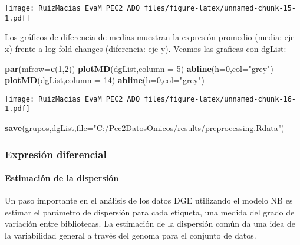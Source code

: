 \documentclass[
]{article}
\newenvironment{Shaded}{\begin{snugshade}}{\end{snugshade}}
\newcommand{\DataTypeTok}[1]{\textcolor[rgb]{0.13,0.29,0.53}{#1}}
\newcommand{\DecValTok}[1]{\textcolor[rgb]{0.00,0.00,0.81}{#1}}
\newcommand{\KeywordTok}[1]{\textcolor[rgb]{0.13,0.29,0.53}{\textbf{#1}}}
\newcommand{\NormalTok}[1]{#1}
\newcommand{\StringTok}[1]{\textcolor[rgb]{0.31,0.60,0.02}{#1}}
\begin{document}
\texttt{[image: RuizMacias\_EvaM\_PEC2\_ADO\_files/figure-latex/unnamed-chunk-15-1.pdf]}

Los gráficos de diferencia de medias muestran la expresión promedio
(media: eje x) frente a log-fold-changes (diferencia: eje y). Veamos las
graficas con dgList:

\begin{Shaded}
\begin{Highlighting}[]
\KeywordTok{par}\NormalTok{(}\DataTypeTok{mfrow=}\KeywordTok{c}\NormalTok{(}\DecValTok{1}\NormalTok{,}\DecValTok{2}\NormalTok{))}
\KeywordTok{plotMD}\NormalTok{(dgList,}\DataTypeTok{column =} \DecValTok{5}\NormalTok{)}
\KeywordTok{abline}\NormalTok{(}\DataTypeTok{h=}\DecValTok{0}\NormalTok{,}\DataTypeTok{col=}\StringTok{"grey"}\NormalTok{)}
\KeywordTok{plotMD}\NormalTok{(dgList,}\DataTypeTok{column =} \DecValTok{14}\NormalTok{)}
\KeywordTok{abline}\NormalTok{(}\DataTypeTok{h=}\DecValTok{0}\NormalTok{,}\DataTypeTok{col=}\StringTok{"grey"}\NormalTok{)}
\end{Highlighting}
\end{Shaded}

\texttt{[image: RuizMacias\_EvaM\_PEC2\_ADO\_files/figure-latex/unnamed-chunk-16-1.pdf]}

\begin{Shaded}
\begin{Highlighting}[]
\KeywordTok{save}\NormalTok{(grupos,dgList,}\DataTypeTok{file=}\StringTok{"C:/Pec2DatosOmicos/results/preprocessing.Rdata"}\NormalTok{)}
\end{Highlighting}
\end{Shaded}

\hypertarget{expresiuxf3n-diferencial}{%
\subsubsection{Expresión diferencial}\label{expresiuxf3n-diferencial}}

\hypertarget{estimaciuxf3n-de-la-dispersiuxf3n}{%
\paragraph{Estimación de la
dispersión}\label{estimaciuxf3n-de-la-dispersiuxf3n}}

Un paso importante en el análisis de los datos DGE utilizando el modelo
NB es estimar el parámetro de dispersión para cada etiqueta, una medida
del grado de variación entre bibliotecas. La estimación de la dispersión
común da una idea de la variabilidad general a través del genoma para el
conjunto de datos.
\end{document}
